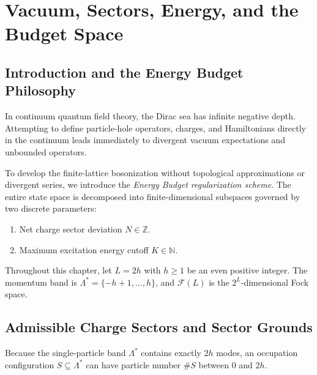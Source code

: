 \chapter{Vacuum, Sectors, Energy, and the Budget Space}
\label{ch:vacuum_budget}

\section{Introduction and the Energy Budget Philosophy}

In continuum quantum field theory, the Dirac sea has infinite negative depth. Attempting to define particle-hole operators, charges, and Hamiltonians directly in the continuum leads immediately to divergent vacuum expectations and unbounded operators. 

To develop the finite-lattice bosonization without topological approximations or divergent series, we introduce the \emph{Energy Budget regularization scheme}. The entire state space is decomposed into finite-dimensional subspaces governed by two discrete parameters:
\begin{enumerate}
    \item Net charge sector deviation $N \in \mathbb{Z}$.
    \item Maximum excitation energy cutoff $K \in \mathbb{N}$.
\end{enumerate}

Throughout this chapter, let $L = 2h$ with $h \ge 1$ be an even positive integer. The momentum band is $\Lambda^* = \{-h+1, \dots, h\}$, and $\mathcal{F}(L)$ is the $2^L$-dimensional Fock space.

\section{Admissible Charge Sectors and Sector Grounds}

Because the single-particle band $\Lambda^*$ contains exactly $2h$ modes, an occupation configuration $S \subseteq \Lambda^*$ can have particle number $\#S$ between $0$ and $2h$. 

